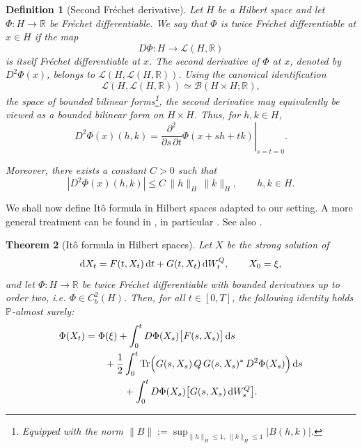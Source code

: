 \documentclass[12pt]{amsart}
\newcommand{\D}[1]{\mbox{\rm #1}}
\newcommand{\dd}{\D{d}}
\numberwithin{equation}{section}
\newtheorem{theorem}{Theorem}[section]
\newtheorem{definition}[theorem]{Definition}
\begin{document}
\begin{definition}[Second Fr\'echet derivative]
Let $H$ be a Hilbert space and let $\Phi:H\to\mathbb{R}$ be Fr\'echet differentiable. We say that $\Phi$ is twice Fr\'echet differentiable at $x\in H$ if the map
\[
    D\Phi:H\to \mathscr L(H,\mathbb{R})
\]
is itself Fr\'echet differentiable at $x$. The second derivative of $\Phi$ at $x$, denoted by $D^2\Phi(x)$, 
belongs to $\mathscr L(H,\mathscr L(H,\mathbb{R})).$
Using the canonical identification
\[
    \mathscr L(H,\mathscr L(H,\mathbb{R})) \simeq \mathscr B(H\times H;\mathbb{R}),
\]
the space of bounded bilinear forms\footnote{Equipped with the norm $\|B\| := \sup_{\|h\|_H\le 1,\ \|k\|_H\le 1} |B(h,k)|$.}, the second derivative may equivalently be viewed as a bounded bilinear form on $H\times H$. Thus, for $h,k\in H$,
\[
    D^2\Phi(x)(h,k) = \left. \frac{\partial^2}{\partial s\,\partial t} \Phi(x+sh+tk) \right|_{s=t=0}.
\]

Moreover, there exists a constant $C>0$ such that
\[
    |D^2\Phi(x)(h,k)| \le C\,\|h\|_H\,\|k\|_H, \qquad h,k\in H.
\]
\end{definition}

We shall now define It\^{o} formula in Hilbert spaces adapted to our setting. A more general treatment can be found in \cite[\S 6.4, page 176]{chow2007stochastic}, in particular \cite[Theorem 4.2, page 177]{chow2007stochastic}. See also \cite[Theorem 6.1.1, page 180]{liu2015stochastic}.


\begin{theorem}[It\^{o} formula in Hilbert spaces]
\label{thm:Ito in H}
Let $X$ be the strong solution of
\[
    \dd X_t = F(t,X_t)\,\dd t + G(t,X_t)\,\dd W_t^Q, \qquad X_0=\xi,
\]
and let $\Phi:H\to\mathbb{R}$ be twice Fr\'echet differentiable with bounded derivatives up to order two, i.e. $\Phi \in C_b^2(H)$. 
Then, for all $t\in[0,T]$, the following identity holds $\mathbb{P}$-almost surely:
\begin{align*}
    \Phi(X_t)
    & = \Phi(\xi)
    + \int_0^t D\Phi(X_s)\big[F(s,X_s)\big]\,\dd s \\
    &\qquad + \frac{1}{2} \int_0^t \mathrm{Tr}\Big(
    G(s,X_s)\,Q\,G(s,X_s)^* \, D^2\Phi(X_s)
    \Big)\,\dd s \\
    &\qquad \qquad + \int_0^t D\Phi(X_s)\big[G(s,X_s)\,\dd W_s^Q\big].
\end{align*}
\end{theorem}
\end{document}
